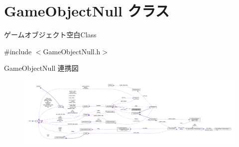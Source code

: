 \hypertarget{class_game_object_null}{}\section{Game\+Object\+Null クラス}
\label{class_game_object_null}


ゲームオブジェクト空白\+Class  




{\ttfamily \#include $<$Game\+Object\+Null.\+h$>$}



Game\+Object\+Null 連携図\nopagebreak
\begin{figure}[H]
\begin{center}
\leavevmode
\includegraphics[width=350pt]{class_game_object_null__coll__graph}
\end{center}
\end{figure}

